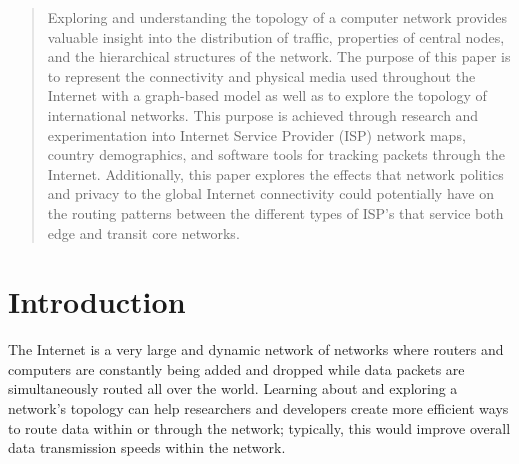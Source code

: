 \documentclass{sigcomm-alternate}
\begin{document}
\maketitle

\begin{abstract}
Exploring and understanding the topology of a computer network provides valuable insight into the distribution of traffic, properties of central nodes, and the hierarchical structures of the network. The purpose of this paper is to represent the connectivity and physical media used throughout the Internet with a graph-based model as well as to explore the topology of international networks. This purpose is achieved through research and experimentation into Internet Service Provider (ISP) network maps, country demographics, and software tools for tracking packets through the Internet. Additionally, this paper explores the effects that network politics and privacy to the global Internet connectivity could potentially have on the routing patterns between the different types of ISP's that service both edge and transit core networks. 

\end{abstract}

\section{Introduction}
The Internet is a very large and dynamic network of networks where routers and computers are constantly being added and dropped while data packets are simultaneously routed all over the world. Learning about and exploring a network’s topology can help researchers and developers create more efficient ways to route data within or through the network; typically, this would improve overall data transmission speeds within the network.
\end{document}
